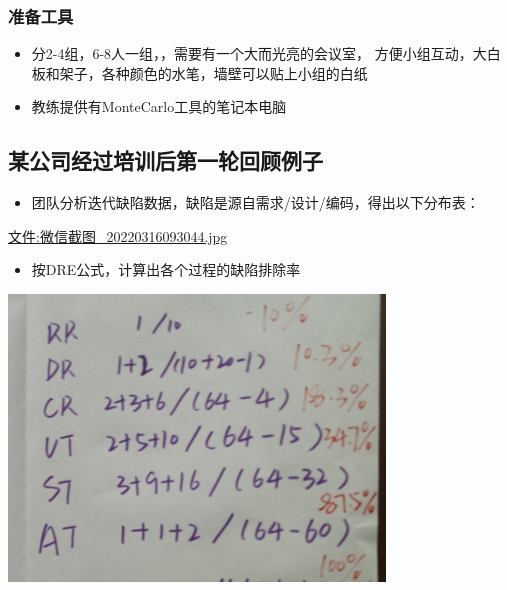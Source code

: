 \hypertarget{ux51c6ux5907ux5de5ux5177}{%
\subsubsection{准备工具}\label{ux51c6ux5907ux5de5ux5177}}

\begin{itemize}
\tightlist
\item
  分2-4组，6-8人一组，，需要有一个大而光亮的会议室，
  方便小组互动，大白板和架子，各种颜色的水笔，墙壁可以贴上小组的白纸
\item
  教练提供有MonteCarlo工具的笔记本电脑
\end{itemize}

\hypertarget{ux67d0ux516cux53f8ux7ecfux8fc7ux57f9ux8badux540eux7b2cux4e00ux8f6eux56deux987eux4f8bux5b50}{%
\subsection{某公司经过培训后第一轮回顾例子}\label{ux67d0ux516cux53f8ux7ecfux8fc7ux57f9ux8badux540eux7b2cux4e00ux8f6eux56deux987eux4f8bux5b50}}

\begin{itemize}
\tightlist
\item
  团队分析迭代缺陷数据，缺陷是源自需求/设计/编码，得出以下分布表：
\end{itemize}

\url{文件:微信截图_20220316093044.jpg}

\begin{itemize}
\tightlist
\item
  按DRE公式，计算出各个过程的缺陷排除率
\end{itemize}


\includegraphics[width=10cm]{2DreEstimateScreenshot_2021-12-01_212049.png}

